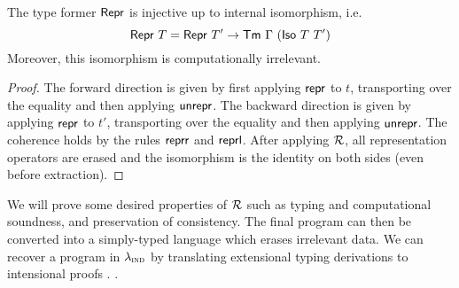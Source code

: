\begin{lemma}
	The type former $\textsf{Repr}{}$ is injective up to internal isomorphism, i.e.
	\begin{equation}
	\mta{Repr}\ T = \mta{Repr}\ T' \to \Tm\ \Gamma\ (\mta{Iso}\ T\ T')
	\end{equation}
	Moreover, this isomorphism is computationally irrelevant.
	\begin{proof}
	The forward direction is given by first applying $\textsf{repr}$ to $t$,
	transporting over the equality and then applying $\textsf{unrepr}$. The
	backward direction is given by applying $\textsf{repr}$ to $t'$, transporting
	over the equality and then applying $\textsf{unrepr}$. The coherence holds by
	the rules $\textsf{reprr}$ and $\textsf{reprl}$. After applying $\mathcal{R}$, all
	representation operators are erased and the isomorphism is the identity on both
	sides (even before extraction).
	\end{proof}
\end{lemma}


We will prove some desired properties
of $\mathcal{R}$ \cite{Boulier2017-cm} such as typing and computational soundness, and
preservation of consistency. The final program can then be converted into a
simply-typed language which erases irrelevant data. We can recover a program in
$\lambda_{\textsc{ind}}$ by translating extensional typing derivations to intensional proofs
\cite{Winterhalter2019-zw}.
\cite{Winterhalter2019-zw}.
